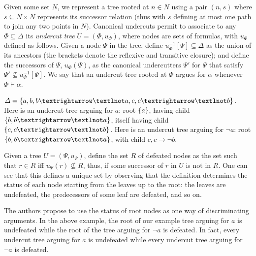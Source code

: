\documentclass[version=3.21, pagesize, twoside=off, bibliography=totoc, DIV=calc, fontsize=12pt, a4paper, french, english]{scrartcl}
\begin{document}
Given some set $N$, we represent a tree rooted at $n \in N$ using a pair $(n, s)$ where $s \subseteq N × N$ represents its successor relation (thus with $s$ defining at most one path to join any two points in $N$). 
Canonical undercuts permit to associate to any $\Phi \subseteq \Delta$ its \emph{undercut tree} $U = (\Phi, u_\Phi)$, where nodes are sets of formulas, with $u_\Phi$ defined as follows. 
Given a node $\Psi$ in the tree, define $u_\Phi^{-1}[\Psi] \subseteq \Delta$ as the union of its ancestors (the brackets denote the reflexive and transitive closure); and define the successors of $\Psi$, $u_\Phi(\Psi)$, as the canonical undercutters $\Psi'$ for $\Psi$ that satisfy $\Psi' \nsubseteq u_\Phi^{-1}[\Psi]$.
We say that an undercut tree rooted at $\Phi$ argues for $\alpha$ whenever $\Phi ⊢ \alpha$.

\begin{example}
	$\Delta = \set{a, b, b → ¬a, c, c → ¬b}$. Here is an undercut tree arguing for $a$: root $\{a\}$, having child $\set{b, b → ¬a}$, itself having child $\set{c, c → ¬b}$. Here is an undercut tree arguing for $¬a$: root $\set{b, b → ¬a}$, with child ${c, c → ¬b}$.
\end{example}

Given a tree $U = (\Psi, u_\Psi)$, define the set $R$ of defeated nodes as the set such that $r \in R$ iff $u_\Psi(r) \nsubseteq R$, thus, if some successor of $r$ in $U$ is not in $R$.
One can see that this defines a unique set by observing that the definition determines the status of each node starting from the leaves up to the root: the leaves are undefeated, the predecessors of some leaf are defeated, and so on.

The authors propose to use the status of root nodes as one way of discriminating arguments.
In the above example, the root of our example tree arguing for $a$ is undefeated while the root of the tree arguing for $¬a$ is defeated. In fact, every undercut tree arguing for $a$ is undefeated while every undercut tree arguing for $¬a$ is defeated.
\end{document}
